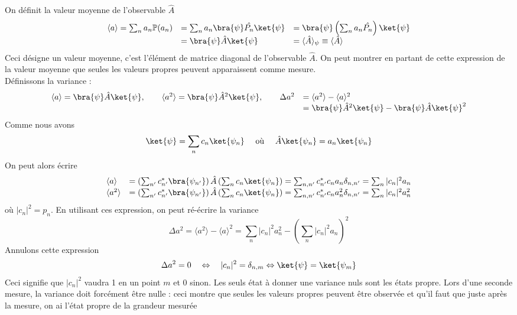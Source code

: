  On définit la valeur moyenne de l'observable $\hat{A}$
 \begin{equation}
\begin{array}{lll}
 \langle a\rangle = \sum_n a_n\mathbb{P}(a_n) &= \sum_n a_n\bra{\psi}\hat{P_n}\ket{\psi} &=  
 \bra{\psi}\left(\sum_n a_n\hat{P_n}\right)\ket{\psi}\\
 &= \bra{\psi}\hat{A}\ket{\psi} &= \langle \hat{A}\rangle_\psi \equiv \langle\hat{A}\rangle
\end{array}
 \end{equation}
 Ceci désigne un valeur moyenne, c'est l'élément de matrice diagonal de 
 l'observable $\hat{A}$. On peut montrer en partant de cette 
 expression de la valeur moyenne que seules les valeurs propres peuvent apparaissent 
 comme mesure.\\
 Définissons la variance :
 \begin{equation}
 \begin{array}{ll}
 \langle a\rangle = \bra{\psi}\hat{A}\ket{\psi},\qquad  \langle a^2\rangle = \bra{\psi}\hat{A}^2
 \ket{\psi}, \qquad \Delta a^2 &=  \langle a^2\rangle - \langle a\rangle^2\\
 &= \bra{\psi}\hat{A}^2\ket{\psi} - \bra{\psi}\hat{A}\ket{\psi}^2
 \end{array}
 \end{equation}
 Comme nous avons 
 \begin{equation}
 \ket{\psi} = \sum_n c_n \ket{\psi_n}\quad\text{ où }\quad \hat{A}\ket{\psi_n}=a_n\ket{\psi_n}
 \end{equation}
 On peut alors écrire
 \begin{equation}
 \begin{array}{ll}
 \langle a \rangle &= \left(\sum_{n'} c_{n'}^*\bra{\psi_{n'}}\right)\hat{A}\left(
 \sum_n c_n\ket{\psi_n}\right)= \sum_{n,n'} c_{n'}^*c_n a_n\delta_{n,n'} = \sum_n |c_n|^2 a_n\\
 \langle a^2 \rangle &= \left(\sum_{n'} c_{n'}^*\bra{\psi_{n'}}\right)\hat{A}\left(
 \sum_n c_n\ket{\psi_n}\right)= \sum_{n,n'} c_{n'}^*c_n a_n^2\delta_{n,n'} = \sum_n |c_n|^2 a_n^2 
 \end{array}
 \end{equation}
 où $|c_n|^2 = p_n$. En utilisant ces expression, on peut ré-écrire la variance
 \begin{equation}
 \Delta a^2 = \langle a^2\rangle - \langle a\rangle^2 = \sum_n |c_n|^2 a_n^2 - 
 \left(\sum_n |c_n|^2 a_n\right)^2
 \end{equation}
 Annulons cette expression%
 \begin{equation}
 \Delta a^2 = 0\quad \Leftrightarrow\quad |c_n|^2 = \delta_{n,m} \Leftrightarrow
 \ket{\psi} = \ket{\psi_m}
 \end{equation}
 Ceci signifie que $|c_n|^2$ vaudra 1 en un point $m$ et 0 sinon.
 Les seuls état à donner une variance nuls sont les états propre.  Lors d'une 
 seconde mesure, la variance doit forcément être nulle : ceci montre que seules 
 les valeurs propres peuvent être observée et qu'il faut que juste après la 
 mesure, on ai l'état propre de la grandeur mesurée\\
 
